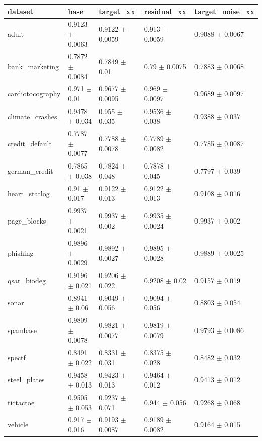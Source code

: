 \begin{tabular}{lllll}
\toprule
dataset & base & target\_xx & residual\_xx & target\_noise\_xx \\
\midrule
adult & 0.9123 $\pm$ 0.0063 & 0.9122 $\pm$ 0.0059 & 0.913 $\pm$ 0.0059 & 0.9088 $\pm$ 0.0067 \\
bank\_marketing & 0.7872 $\pm$ 0.0084 & 0.7849 $\pm$ 0.01 & 0.79 $\pm$ 0.0075 & 0.7883 $\pm$ 0.0068 \\
cardiotocography & 0.971 $\pm$ 0.01 & 0.9677 $\pm$ 0.0095 & 0.969 $\pm$ 0.0097 & 0.9689 $\pm$ 0.0097 \\
climate\_crashes & 0.9478 $\pm$ 0.034 & 0.955 $\pm$ 0.035 & 0.9536 $\pm$ 0.038 & 0.9388 $\pm$ 0.037 \\
credit\_default & 0.7787 $\pm$ 0.0077 & 0.7788 $\pm$ 0.0078 & 0.7789 $\pm$ 0.0082 & 0.7785 $\pm$ 0.0087 \\
german\_credit & 0.7865 $\pm$ 0.038 & 0.7824 $\pm$ 0.048 & 0.7878 $\pm$ 0.045 & 0.7797 $\pm$ 0.039 \\
heart\_statlog & 0.91 $\pm$ 0.017 & 0.9122 $\pm$ 0.013 & 0.9122 $\pm$ 0.013 & 0.9108 $\pm$ 0.016 \\
page\_blocks & 0.9937 $\pm$ 0.0021 & 0.9937 $\pm$ 0.002 & 0.9935 $\pm$ 0.0024 & 0.9937 $\pm$ 0.002 \\
phishing & 0.9896 $\pm$ 0.0029 & 0.9892 $\pm$ 0.0027 & 0.9895 $\pm$ 0.0028 & 0.9889 $\pm$ 0.0025 \\
qsar\_biodeg & 0.9196 $\pm$ 0.021 & 0.9206 $\pm$ 0.022 & 0.9208 $\pm$ 0.02 & 0.9157 $\pm$ 0.019 \\
sonar & 0.8941 $\pm$ 0.06 & 0.9049 $\pm$ 0.056 & 0.9094 $\pm$ 0.056 & 0.8803 $\pm$ 0.054 \\
spambase & 0.9809 $\pm$ 0.0078 & 0.9821 $\pm$ 0.0077 & 0.9819 $\pm$ 0.0079 & 0.9793 $\pm$ 0.0086 \\
spectf & 0.8491 $\pm$ 0.022 & 0.8331 $\pm$ 0.031 & 0.8375 $\pm$ 0.028 & 0.8482 $\pm$ 0.032 \\
steel\_plates & 0.9458 $\pm$ 0.013 & 0.9423 $\pm$ 0.013 & 0.9464 $\pm$ 0.012 & 0.9413 $\pm$ 0.012 \\
tictactoe & 0.9505 $\pm$ 0.053 & 0.9237 $\pm$ 0.071 & 0.944 $\pm$ 0.056 & 0.9268 $\pm$ 0.068 \\
vehicle & 0.917 $\pm$ 0.016 & 0.9193 $\pm$ 0.0087 & 0.9189 $\pm$ 0.0082 & 0.9164 $\pm$ 0.015 \\
\bottomrule
\end{tabular}
